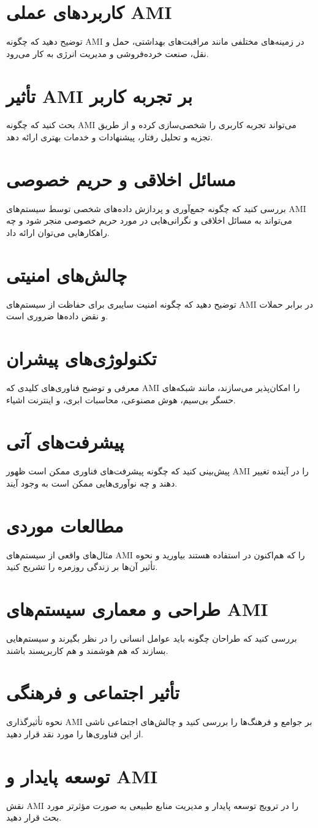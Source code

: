 \section*{کاربردهای عملی AMI}
توضیح دهید که چگونه AMI در زمینه‌های مختلفی مانند مراقبت‌های بهداشتی، حمل و نقل، صنعت خرده‌فروشی و مدیریت انرژی به کار می‌رود.

\section*{تأثیر AMI بر تجربه کاربر}
بحث کنید که چگونه AMI می‌تواند تجربه کاربری را شخصی‌سازی کرده و از طریق تجزیه و تحلیل رفتار، پیشنهادات و خدمات بهتری ارائه دهد.

\section*{مسائل اخلاقی و حریم خصوصی}
بررسی کنید که چگونه جمع‌آوری و پردازش داده‌های شخصی توسط سیستم‌های AMI می‌تواند به مسائل اخلاقی و نگرانی‌هایی در مورد حریم خصوصی منجر شود و چه راهکارهایی می‌توان ارائه داد.

\section*{چالش‌های امنیتی}
توضیح دهید که چگونه امنیت سایبری برای حفاظت از سیستم‌های AMI در برابر حملات و نقض داده‌ها ضروری است.

\section*{تکنولوژی‌های پیشران}
معرفی و توضیح فناوری‌های کلیدی که AMI را امکان‌پذیر می‌سازند، مانند شبکه‌های حسگر بی‌سیم، هوش مصنوعی، محاسبات ابری، و اینترنت اشیاء.

\section*{پیشرفت‌های آتی}
پیش‌بینی کنید که چگونه پیشرفت‌های فناوری ممکن است ظهور AMI را در آینده تغییر دهند و چه نوآوری‌هایی ممکن است به وجود آیند.

\section*{مطالعات موردی}
مثال‌های واقعی از سیستم‌های AMI را که هم‌اکنون در استفاده هستند بیاورید و نحوه تأثیر آن‌ها بر زندگی روزمره را تشریح کنید.

\section*{طراحی و معماری سیستم‌های AMI}
بررسی کنید که طراحان چگونه باید عوامل انسانی را در نظر بگیرند و سیستم‌هایی بسازند که هم هوشمند و هم کاربرپسند باشند.

\section*{تأثیر اجتماعی و فرهنگی}
نحوه تأثیرگذاری AMI بر جوامع و فرهنگ‌ها را بررسی کنید و چالش‌های اجتماعی ناشی از این فناوری‌ها را مورد نقد قرار دهید.

\section*{توسعه پایدار و AMI}
نقش AMI را در ترویج توسعه پایدار و مدیریت منابع طبیعی به صورت مؤثرتر مورد بحث قرار دهید.
